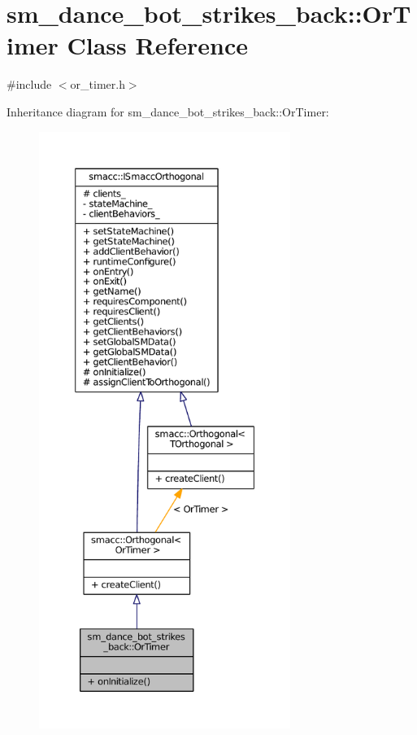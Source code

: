 \hypertarget{classsm__dance__bot__strikes__back_1_1OrTimer}{}\section{sm\+\_\+dance\+\_\+bot\+\_\+strikes\+\_\+back\+:\+:Or\+Timer Class Reference}
\label{classsm__dance__bot__strikes__back_1_1OrTimer}


{\ttfamily \#include $<$or\+\_\+timer.\+h$>$}



Inheritance diagram for sm\+\_\+dance\+\_\+bot\+\_\+strikes\+\_\+back\+:\+:Or\+Timer\+:
\nopagebreak
\begin{figure}[H]
\begin{center}
\leavevmode
\includegraphics[height=550pt]{classsm__dance__bot__strikes__back_1_1OrTimer__inherit__graph}
\end{center}
\end{figure}


